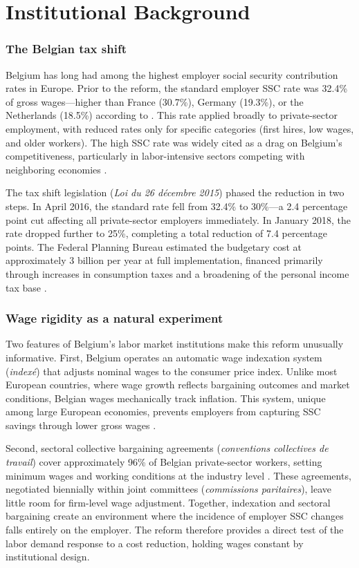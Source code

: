 \documentclass[12pt]{article}
\begin{document}
\section{Institutional Background} \label{sec:background}

\subsubsection*{The Belgian tax shift} Belgium has long had among the highest employer social security contribution rates in Europe. Prior to the reform, the standard employer SSC rate was 32.4\% of gross wages---higher than France (30.7\%), Germany (19.3\%), or the Netherlands (18.5\%) according to \citet{oecd2019}. This rate applied broadly to private-sector employment, with reduced rates only for specific categories (first hires, low wages, and older workers). The high SSC rate was widely cited as a drag on Belgium's competitiveness, particularly in labor-intensive sectors competing with neighboring economies \citep{nbb2019}.

The tax shift legislation (\textit{Loi du 26 d\'{e}cembre 2015}) phased the reduction in two steps. In April 2016, the standard rate fell from 32.4\% to 30\%---a 2.4 percentage point cut affecting all private-sector employers immediately. In January 2018, the rate dropped further to 25\%, completing a total reduction of 7.4 percentage points. The Federal Planning Bureau estimated the budgetary cost at approximately \texteuro{}3 billion per year at full implementation, financed primarily through increases in consumption taxes and a broadening of the personal income tax base \citep{fpb2015}.

\subsubsection*{Wage rigidity as a natural experiment} Two features of Belgium's labor market institutions make this reform unusually informative. First, Belgium operates an automatic wage indexation system (\textit{index\'{e}}) that adjusts nominal wages to the consumer price index. Unlike most European countries, where wage growth reflects bargaining outcomes and market conditions, Belgian wages mechanically track inflation. This system, unique among large European economies, prevents employers from capturing SSC savings through lower gross wages \citep{dolsetal2020}.

Second, sectoral collective bargaining agreements (\textit{conventions collectives de travail}) cover approximately 96\% of Belgian private-sector workers, setting minimum wages and working conditions at the industry level \citep{calmforsdriffill1988}. These agreements, negotiated biennially within joint committees (\textit{commissions paritaires}), leave little room for firm-level wage adjustment. Together, indexation and sectoral bargaining create an environment where the incidence of employer SSC changes falls entirely on the employer. The reform therefore provides a direct test of the labor demand response to a cost reduction, holding wages constant by institutional design.
\end{document}
